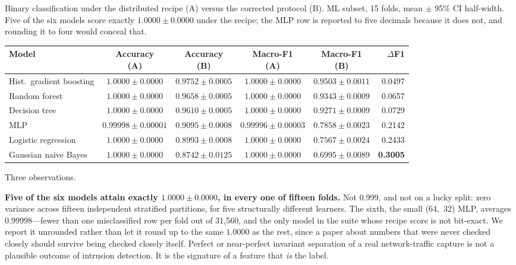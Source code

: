 \begin{vtable}
\centering
\footnotesize
\caption{Binary classification under the distributed recipe (A) versus the
corrected protocol (B). ML subset, 15 folds, mean $\pm$ 95\% CI half-width.
Five of the six models score exactly $1.0000 \pm 0.0000$ under the recipe; the
MLP row is reported to five decimals because it does not, and rounding it to
four would conceal that.}
\label{tab:kfold}
\begin{fittable}
\begin{tabular}{lcccc r}
\toprule
Model & \makecell{Accuracy\\(A)} & \makecell{Accuracy\\(B)} & \makecell{Macro-F1\\(A)} & \makecell{Macro-F1\\(B)} & $\Delta$F1 \\
\midrule
Hist.\ gradient boosting & $\mathbf{1.0000 \pm 0.0000}$ & $0.9752 \pm 0.0005$ & $\mathbf{1.0000 \pm 0.0000}$ & $\mathbf{0.9503 \pm 0.0011}$ & 0.0497 \\
Random forest            & $\mathbf{1.0000 \pm 0.0000}$ & $0.9658 \pm 0.0005$ & $\mathbf{1.0000 \pm 0.0000}$ & $0.9343 \pm 0.0009$ & 0.0657 \\
Decision tree            & $\mathbf{1.0000 \pm 0.0000}$ & $0.9610 \pm 0.0005$ & $\mathbf{1.0000 \pm 0.0000}$ & $0.9271 \pm 0.0009$ & 0.0729 \\
MLP                      & $0.99998 \pm 0.00001$ & $0.9095 \pm 0.0008$ & $0.99996 \pm 0.00003$ & $0.7858 \pm 0.0023$ & 0.2142 \\
Logistic regression      & $\mathbf{1.0000 \pm 0.0000}$ & $0.8993 \pm 0.0008$ & $\mathbf{1.0000 \pm 0.0000}$ & $0.7567 \pm 0.0024$ & 0.2433 \\
Gaussian naive Bayes     & $\mathbf{1.0000 \pm 0.0000}$ & $0.8742 \pm 0.0125$ & $\mathbf{1.0000 \pm 0.0000}$ & $0.6995 \pm 0.0089$ & \textbf{0.3005} \\
\bottomrule
\end{tabular}
\end{fittable}
\end{vtable}

Three observations.

\textbf{Five of the six models attain exactly $1.0000 \pm 0.0000$, in every one
of fifteen folds.} Not 0.999, and not on a lucky split: zero variance across
fifteen independent stratified partitions, for five structurally different
learners. The sixth, the small \mbox{(64, 32)} MLP, averages 0.99998---fewer
than one misclassified row per fold out of 31{,}560, and the only model in the
suite whose recipe score is not bit-exact. We report it unrounded rather than
let it round up to the same $1.0000$ as the rest, since a paper about numbers
that were never checked closely should survive being checked closely itself.
Perfect or near-perfect invariant separation of a real network-traffic capture
is not a plausible outcome of intrusion detection. It is the signature of a
feature that \emph{is} the label.

